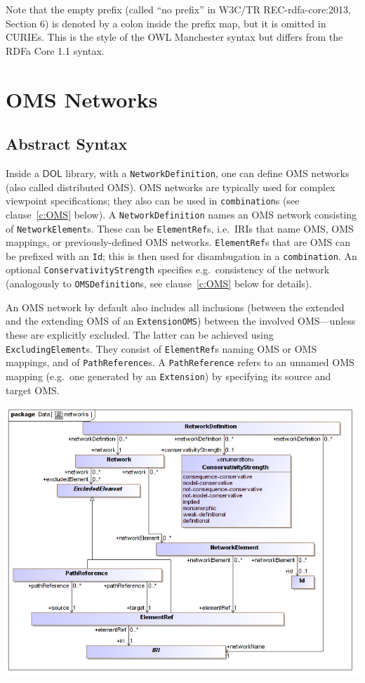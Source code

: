 \documentclass[10pt,fleqn,final]{scrreprt}
\newcommand*{\syntax}[1]{\texttt{#1}}
\newcommand*{\DOL}{\ensuremath{\mathsf{DOL}}\xspace}
\newcommand{\sclause}[1]{\section{#1}}
\newcommand{\ssclause}[1]{\subsection{#1}}
\newcommand{\nisref}[1]{#1}
\newenvironment{definitions}[0]{\medskip }{}
\begin{document}
\begin{definitions}
 Note that the empty prefix (called ``no prefix'' in \nisref{W3C/TR REC-rdfa-core:2013, Section 6}) is denoted by a colon inside the prefix map, but it is omitted in CURIEs.  This is the style of the OWL Manchester syntax \cite{W3C:NOTE-owl2-manchester-syntax-20091027} but differs from the RDFa Core 1.1 syntax.

\vspace{1em}
	



\sclause{OMS Networks}\label{c:networks}
\ssclause{Abstract Syntax}

Inside a \DOL library, with a \syntax{NetworkDefinition}, one can
define OMS networks (also called distributed OMS). OMS networks are
typically used for complex viewpoint specifications; they also can be
used in \syntax{combination}s (see clause~\ref{c:OMS} below). A
\syntax{NetworkDefinition} names an OMS network consisting of
\syntax{NetworkElement}s. These can be \syntax{ElementRef}s,
i.e.\ IRIs that name OMS, OMS mappings, or previously-defined OMS
networks. \syntax{ElementRef}s that are OMS can be prefixed with an
\syntax{Id}; this is then used for disambugation in a
\syntax{combination}.  An optional \syntax{ConservativityStrength}
specifies e.g.\ consistency of the network (analogously to
\syntax{OMSDefinition}s, see clause~\ref{c:OMS} below for details).


An OMS network by default also includes all inclusions (between
the extended and the extending OMS of an \syntax{ExtensionOMS})
between the involved OMS---unless these are explicitly excluded.
The latter can be achieved using \syntax{ExcludingElement}s.
They consist of \syntax{ElementRef}s naming OMS or OMS mappings,
and of \syntax{PathReference}s. A \syntax{PathReference} refers
to an unnamed OMS mapping (e.g.\ one generated by an \syntax{Extension}) 
by specifying its source and target OMS.
\medskip
\begin{center}
\includegraphics[scale=0.47]{mof/networks.png}
\end{center}



\end{definitions}
\end{document}
